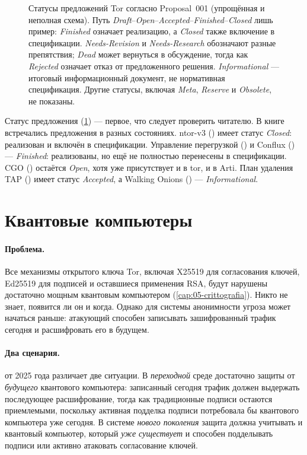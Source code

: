 \begin{figure}[htbp]
\centering

\caption{Статусы предложений Tor согласно Proposal~001 (упрощённая и неполная схема). Путь \emph{Draft}--\emph{Open}--\emph{Accepted}--\emph{Finished}--\emph{Closed} лишь пример: \emph{Finished} означает реализацию, а \emph{Closed} также включение в спецификации. \emph{Needs-Revision} и \emph{Needs-Research} обозначают разные препятствия; \emph{Dead} может вернуться в обсуждение, тогда как \emph{Rejected} означает отказ от предложенного решения. \emph{Informational} — итоговый информационный документ, не нормативная спецификация. Другие статусы, включая \emph{Meta}, \emph{Reserve} и \emph{Obsolete}, не показаны.}
\label{fig:proposte}
\end{figure}

Статус предложения (\cref{fig:proposte}) — первое, что следует проверить читателю. В книге встречались предложения в разных состояниях. ntor-v3 () имеет статус \emph{Closed}: реализован и включён в спецификации. Управление перегрузкой () и Conflux () — \emph{Finished}: реализованы, но ещё не полностью перенесены в спецификации. CGO () остаётся \emph{Open}, хотя уже присутствует и в tor, и в Arti. План удаления TAP () имеет статус \emph{Accepted}, а Walking Onions () — \emph{Informational}.

\section{Квантовые компьютеры}\label{sec:fut-pq}

\paragraph{Проблема.} Все механизмы открытого ключа Tor, включая X25519 для согласования ключей, Ed25519 для подписей и оставшиеся применения RSA, будут нарушены достаточно мощным квантовым компьютером (\cref{cap:05-crittografia}). Никто не знает, появится ли он и когда. Однако для системы анонимности угроза может начаться раньше: атакующий способен записывать зашифрованный трафик сегодня и расшифровать его в будущем.

\paragraph{Два сценария.}  от 2025 года различает две ситуации. В \emph{переходной} среде достаточно защиты от \emph{будущего} квантового компьютера: записанный сегодня трафик должен выдержать последующее расшифрование, тогда как традиционные подписи остаются приемлемыми, поскольку активная подделка подписи потребовала бы квантового компьютера уже сегодня. В системе \emph{нового поколения} защита должна учитывать и квантовый компьютер, который \emph{уже существует} и способен подделывать подписи или активно атаковать согласование ключей.


